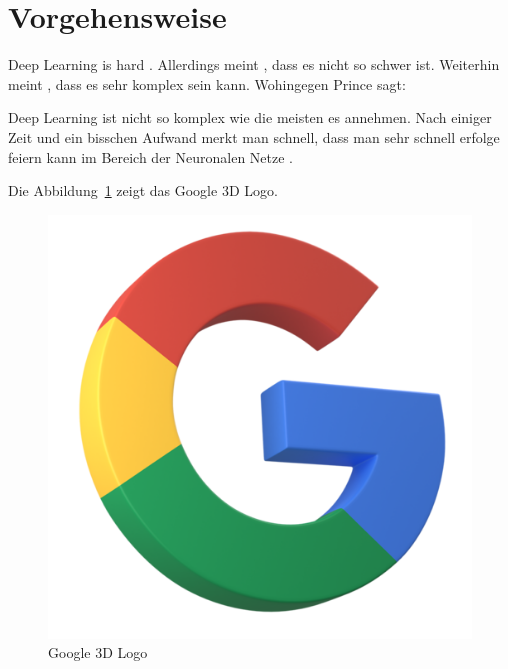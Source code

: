 \section{Vorgehensweise}\label{sec:vorgehensweise}
Deep Learning is hard \autocite[S.15]{deruDeepLearningMit2020}.
Allerdings meint \textcite[S.10]{goodfellowDeepLearning2016}, dass es nicht so schwer ist. 
Weiterhin meint \textcite[S.30]{robertsPrinciplesDeepLearning2022}, dass es sehr komplex sein kann.
Wohingegen Prince sagt: 
\begin{quoting}
Deep Learning ist nicht so komplex wie die meisten es annehmen. Nach einiger Zeit und ein bisschen Aufwand merkt man schnell, dass man sehr schnell erfolge feiern kann im Bereich der Neuronalen Netze \autocite{princeUnderstandingDeepLearning2023}.
\end{quoting}
Die Abbildung~\ref{fig:google3d} zeigt das Google 3D Logo.
\begin{figure}[ht]
  \centering
  \includegraphics[scale=0.25]{google3d}
  \caption{Google 3D Logo}\label{fig:google3d}
\end{figure}
